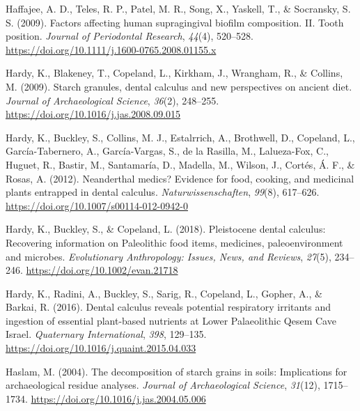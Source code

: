 \documentclass[
  letterpaper,
]{book}
\newlength{\cslhangindent}
\newlength{\cslentryspacingunit} %
\newenvironment{CSLReferences}[2] %
 {%
  \setlength{\parindent}{0pt}
  \ifodd #1
  \let\oldpar\par
  \def\par{\hangindent=\cslhangindent\oldpar}
  \fi
  \setlength{\parskip}{#2\cslentryspacingunit}
 }%
 {}
\begin{document}
\begin{CSLReferences}{1}{0}
\leavevmode{}%
Haffajee, A. D., Teles, R. P., Patel, M. R., Song, X., Yaskell, T., \&
Socransky, S. S. (2009). Factors affecting human supragingival biofilm
composition. {II}. {Tooth} position. \emph{Journal of Periodontal
Research}, \emph{44}(4), 520--528.
\url{https://doi.org/10.1111/j.1600-0765.2008.01155.x}

\leavevmode{}%
Hardy, K., Blakeney, T., Copeland, L., Kirkham, J., Wrangham, R., \&
Collins, M. (2009). Starch granules, dental calculus and new
perspectives on ancient diet. \emph{Journal of Archaeological Science},
\emph{36}(2), 248--255. \url{https://doi.org/10.1016/j.jas.2008.09.015}

\leavevmode{}%
Hardy, K., Buckley, S., Collins, M. J., Estalrrich, A., Brothwell, D.,
Copeland, L., García-Tabernero, A., García-Vargas, S., de la Rasilla,
M., Lalueza-Fox, C., Huguet, R., Bastir, M., Santamaría, D., Madella,
M., Wilson, J., Cortés, Á. F., \& Rosas, A. (2012). Neanderthal medics?
{Evidence} for food, cooking, and medicinal plants entrapped in dental
calculus. \emph{Naturwissenschaften}, \emph{99}(8), 617--626.
\url{https://doi.org/10.1007/s00114-012-0942-0}

\leavevmode{}%
Hardy, K., Buckley, S., \& Copeland, L. (2018). Pleistocene dental
calculus: {Recovering} information on {Paleolithic} food items,
medicines, paleoenvironment and microbes. \emph{Evolutionary
Anthropology: Issues, News, and Reviews}, \emph{27}(5), 234--246.
\url{https://doi.org/10.1002/evan.21718}

\leavevmode{}%
Hardy, K., Radini, A., Buckley, S., Sarig, R., Copeland, L., Gopher, A.,
\& Barkai, R. (2016). Dental calculus reveals potential respiratory
irritants and ingestion of essential plant-based nutrients at {Lower
Palaeolithic Qesem Cave Israel}. \emph{Quaternary International},
\emph{398}, 129--135. \url{https://doi.org/10.1016/j.quaint.2015.04.033}

\leavevmode{}%
Haslam, M. (2004). The decomposition of starch grains in soils:
Implications for archaeological residue analyses. \emph{Journal of
Archaeological Science}, \emph{31}(12), 1715--1734.
\url{https://doi.org/10.1016/j.jas.2004.05.006}


\end{CSLReferences}
\end{document}
